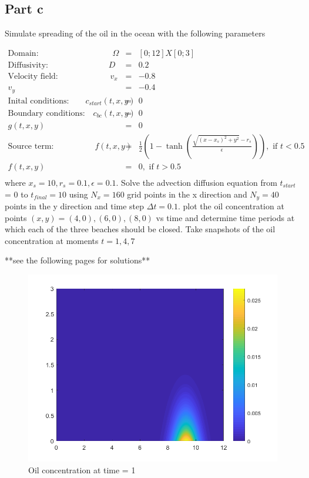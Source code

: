 \documentclass[12pt]{article}
\begin{document}
\newpage
\subsection{Part c}\label{sec::c}
Simulate spreading of the oil in the ocean with the following parameters

\begin{eqnarray}
\textrm{Domain:}\quad \quad \quad \quad \quad \quad \quad \quad \quad \Omega &=& [0;12]X[0;3]   \\\nonumber
\textrm{Diffusivity: }\quad \quad \quad \quad \quad \quad \quad D &=& 0.2\\\nonumber
\textrm{Velocity field: } \quad \quad \quad \quad \quad \quad   v_x &=& -0.8\\\nonumber
v_y &=& -0.4 \\\nonumber
\textrm{Inital conditions:}\quad  \quad c_{start}(t,x,y)&=&0\\\nonumber
\textrm{Boundary conditions:} \quad c_{bc}(t,x,y)&=&0\\\nonumber
g(t,x,y) &=&0\\\nonumber
\textrm{Source term:}\quad \quad \quad \quad  \quad f(t,x,y)&=&\frac{1}{2}\left(1-\tanh \left( \frac{\sqrt{(x-x_s)^2+y^2}-r_s}{\epsilon}\right)\right), \textrm{ if } t<0.5\\\nonumber 
 f(t,x,y)&=&0, \textrm{ if } t > 0.5\\\nonumber 
\end{eqnarray}
where $x_s = 10, r_s = 0.1, \epsilon = 0.1$.  Solve the advection diffusion equation from $t_{start}$ = 0 to $t_{final} = 10$ using $N_x = 160$ grid points in the x direction and $N_y = 40$ points in the y direction and time step $\Delta t = 0.1$.  plot the oil concentration at points $(x,y) = (4, 0), (6, 0), (8, 0)$ vs time and determine time periods at which each of the three beaches should be closed.  Take snapshots of the oil concentration at moments $ t = 1, 4, 7$

**see the following pages for solutions**

\newpage
\begin{figure}[bht]
\begin{center}
\includegraphics[width=1\textwidth]{t1}
\end{center}
\caption{Oil concentration at time = 1} \label{fig::MyFigure}
\end{figure}
\end{document}

